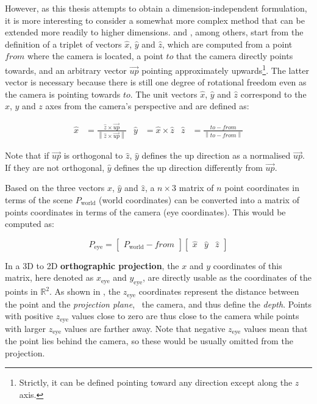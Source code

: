However, as this thesis attempts to obtain a dimension-independent formulation, it is more interesting to consider a somewhat more complex method that can be extended more readily to higher dimensions.
\citet{Foley92} and \citet[Ch.~13]{Hughes14}, among others, start from the definition of a triplet of vectors $\hat{x}$, $\hat{y}$ and $\hat{z}$, which are computed from a point $from$ where the camera is located, a point $to$ that the camera directly points towards, and an arbitrary vector $\overrightarrow{up}$ pointing approximately upwards\footnote{Strictly, it can be defined pointing toward any direction except along the $z$ axis.}.
The latter vector is necessary because there is still one degree of rotational freedom even as the camera is pointing towards $to$.
The unit vectors $\hat{x}$, $\hat{y}$ and $\hat{z}$ correspond to the $x$, $y$ and $z$ axes from the camera's perspective and are defined as:


\begin{align*}
\hat{x} &= \frac{\hat{z} \times \overrightarrow{up}}{\left\lVert{}\hat{z} \times \overrightarrow{up}\right\rVert} &
\hat{y} &= \hat{x} \times \hat{z} &
\hat{z} &= \frac{to-from}{\left\lVert{}to-from\right\rVert}
\end{align*}

Note that if $\overrightarrow{up}$ is orthogonal to $\hat{z}$, $\hat{y}$ defines the up direction as a normalised $\overrightarrow{up}$.
If they are not orthogonal, $\hat{y}$ defines the up direction differently from $\overrightarrow{up}$.

Based on the three vectors $\hat{x}$, $\hat{y}$ and $\hat{z}$, a $n \times 3$ matrix of $n$ point coordinates in terms of the scene $P_\mathrm{world}$ (world coordinates) can be converted into a matrix of points coordinates in terms of the camera (eye coordinates).
This would be computed as:

\begin{equation*}
P_\mathrm{eye} = \begin{bmatrix} P_\mathrm{world} - from \end{bmatrix}
\begin{bmatrix} \hat{x} & \hat{y} & \hat{z} \end{bmatrix}
\end{equation*}

In a 3D to 2D \textbf{orthographic projection}, the $x$ and $y$ coordinates of this matrix, here denoted as $x_\mathrm{eye}$ and $y_\mathrm{eye}$, are directly usable as the coordinates of the points in $\mathbb{R}^2$.
As shown in , the $z_\mathrm{eye}$ coordinates represent the distance between the point and the \emph{projection plane}, \ie\ the camera, and thus define the \emph{depth}.
Points with positive $z_\mathrm{eye}$ values close to zero are thus close to the camera while points with larger $z_\mathrm{eye}$ values are farther away.
Note that negative $z_\mathrm{eye}$ values mean that the point lies behind the camera, so these would be usually omitted from the projection.

